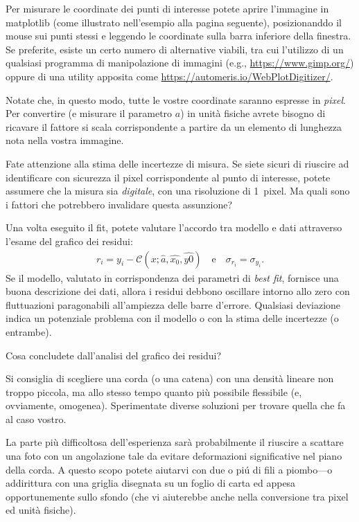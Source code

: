 \documentclass{lab1-article}
\begin{document}
\begin{article}

Per misurare le coordinate dei punti di interesse potete aprire l'immagine in
matplotlib (come illustrato nell'esempio alla pagina seguente), posizionanddo il
mouse sui punti stessi e leggendo le coordinate sulla barra inferiore della
finestra. Se preferite, esiste un certo numero di alternative viabili, tra cui
l'utilizzo di un qualsiasi programma di manipolazione di immagini
(e.g., \url{https://www.gimp.org/}) oppure di una utility apposita come
\url{https://automeris.io/WebPlotDigitizer/}.

Notate che, in questo modo, tutte le vostre coordinate saranno espresse in
\emph{pixel}. Per convertire (e misurare il parametro $a$) in unit\`a fisiche
avrete bisogno di ricavare il fattore si scala corrispondente a partire da un
elemento di lunghezza nota nella vostra immagine.

Fate attenzione alla stima delle incertezze di misura. Se siete sicuri di
riuscire ad identificare con sicurezza il pixel corrispondente al punto di
interesse, potete assumere che la misura sia \emph{digitale}, con una risoluzione
di 1~pixel. Ma quali sono i fattori che potrebbero invalidare questa assunzione?



Una volta eseguito il fit, potete valutare l'accordo tra modello e dati
attraverso l'esame del grafico dei residui:
\begin{align}
  r_i = y_i - \mathcal{C}(x; \hat{a}, \hat{x_0}, \hat{y0}) \quad \text{e}
  \quad \sigma_{r_i} = \sigma_{y_i}.
\end{align}
Se il modello, valutato in corrispondenza dei parametri di \emph{best fit},
fornisce una buona descrizione dei dati, allora i residui debbono oscillare
intorno allo zero con fluttuazioni paragonabili all'ampiezza delle barre
d'errore. Qualsiasi deviazione indica un potenziale problema con il modello o
con la stima delle incertezze (o entrambe).

Cosa concludete dall'analisi del grafico dei residui?


\secconsiderations

Si consiglia di scegliere una corda (o una catena) con una densit\`a lineare
non troppo piccola, ma allo stesso tempo quanto pi\`u possibile flessibile
(e, ovviamente, omogenea). Sperimentate diverse soluzioni per trovare quella che
fa al caso vostro.

La parte pi\`u difficoltosa dell'esperienza sar\`a probabilmente  il riuscire a
scattare una foto con un angolazione tale da evitare deformazioni significative
nel piano della corda. A questo scopo potete aiutarvi con due o pi\'u di fili a
piombo---o addirittura con una griglia disegnata su un foglio di carta ed appesa
opportunemente sullo sfondo (che vi aiuterebbe anche nella conversione tra
pixel ed unit\`a fisiche).


\end{article}
\end{document}
